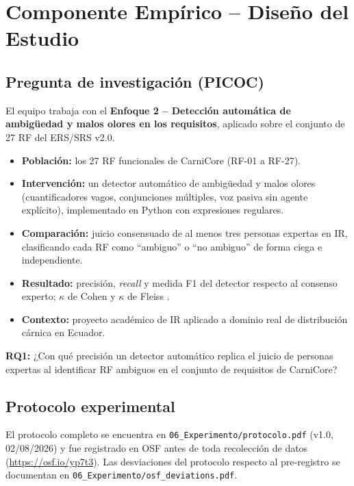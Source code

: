 \documentclass[11pt,a4paper]{article}
\begin{document}
\section{Componente Empírico -- Diseño del Estudio}

\subsection{Pregunta de investigación (PICOC)}

El equipo trabaja con el \textbf{Enfoque 2 -- Detección automática de ambigüedad y malos olores en los requisitos}, aplicado sobre el conjunto de 27 RF del ERS/SRS v2.0.

\begin{itemize}[nosep]
\item \textbf{Población:} los 27 RF funcionales de CarniCore (RF-01 a RF-27).
\item \textbf{Intervención:} un detector automático de ambigüedad y malos olores (cuantificadores vagos, conjunciones múltiples, voz pasiva sin agente explícito), implementado en Python con expresiones regulares.
\item \textbf{Comparación:} juicio consensuado de al menos tres personas expertas en IR, clasificando cada RF como ``ambiguo'' o ``no ambiguo'' de forma ciega e independiente.
\item \textbf{Resultado:} precisión, \textit{recall} y medida F1 del detector respecto al consenso experto; $\kappa$ de Cohen \cite{cohen1960kappa} y $\kappa$ de Fleiss \cite{fleiss1971kappa}.
\item \textbf{Contexto:} proyecto académico de IR aplicado a dominio real de distribución cárnica en Ecuador.
\end{itemize}

\textbf{RQ1:} ¿Con qué precisión un detector automático replica el juicio de personas expertas al identificar RF ambiguos en el conjunto de requisitos de CarniCore?

\subsection{Protocolo experimental}

El protocolo completo se encuentra en \texttt{06\_Experimento/protocolo.pdf} (v1.0, 02/08/2026) y fue registrado en OSF antes de toda recolección de datos (\url{https://osf.io/yp7t3}). Las desviaciones del protocolo respecto al pre-registro se documentan en \texttt{06\_Experimento/osf\_deviations.pdf}.
\end{document}
